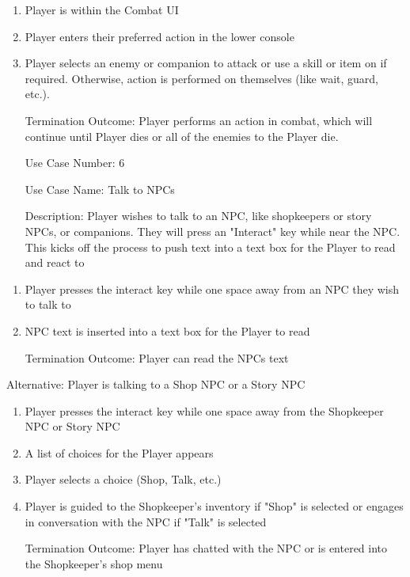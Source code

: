 \documentclass[10pt,conference,onecolumn,compsoc]{IEEEtran}
\begin{document}
\begin{enumerate}
\item Player is within the Combat UI
\item Player enters their preferred action in the lower console
\item Player selects an enemy or companion to attack or use a skill or item on if required. Otherwise, action is performed on themselves (like wait, guard, etc.).
\item [Termination Outcome:] Player performs an action in combat, which will continue until Player dies or all of the enemies to the Player die.
\end{enumerate}

\begin{itemize}
\item[Use Case Number:] 6
\item[Use Case Name:] Talk to NPCs
\item[Description:] Player wishes to talk to an NPC, like shopkeepers or story NPCs, or companions. They will press an "Interact" key while near the NPC. This kicks off the process to push text into a text box for the Player to read and react to
\end{itemize}

\begin{enumerate}
\item Player presses the interact key while one space away from an NPC they wish to talk to
\item NPC text is inserted into a text box for the Player to read
\item [Termination Outcome:] Player can read the NPCs text
\end{enumerate}

Alternative: Player is talking to a Shop NPC or a Story NPC
\begin{enumerate}
\item Player presses the interact key while one space away from the Shopkeeper NPC or Story NPC
\item A list of choices for the Player appears
\item Player selects a choice (Shop, Talk, etc.)
\item Player is guided to the Shopkeeper's inventory if "Shop" is selected or engages in conversation with the NPC if "Talk" is selected
\item [Termination Outcome:] Player has chatted with the NPC or is entered into the Shopkeeper's shop menu
\end{enumerate}
\end{document}
